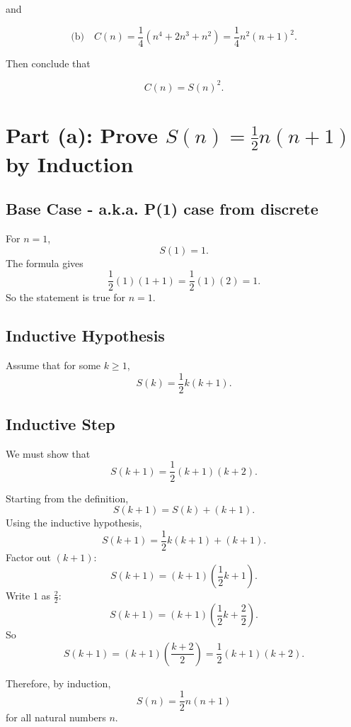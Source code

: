 \documentclass[12pt]{article}
\begin{document}
and

\[
\text{(b)}\quad C(n)=\frac{1}{4}(n^4+2n^3+n^2)=\frac{1}{4}n^2(n+1)^2.
\]

Then conclude that

\[
C(n)=S(n)^2.
\]

\vspace{6cm}

\newpage

\section*{Part (a): Prove \(S(n)=\frac{1}{2}n(n+1)\) by Induction}

\subsection*{Base Case - a.k.a. P(1) case from discrete}

For \(n=1\),
\[
S(1)=1.
\]
The formula gives
\[
\frac{1}{2}(1)(1+1)=\frac{1}{2}(1)(2)=1.
\]
So the statement is true for \(n=1\).

\vspace{3cm}

\subsection*{Inductive Hypothesis}

Assume that for some \(k\geq 1\),
\[
S(k)=\frac{1}{2}k(k+1).
\]

\vspace{3cm}

\subsection*{Inductive Step}

We must show that
\[
S(k+1)=\frac{1}{2}(k+1)(k+2).
\]

Starting from the definition,
\[
S(k+1)=S(k)+(k+1).
\]
Using the inductive hypothesis,
\[
S(k+1)=\frac{1}{2}k(k+1)+(k+1).
\]
Factor out \((k+1)\):
\[
S(k+1)=(k+1)\left(\frac{1}{2}k+1\right).
\]
Write \(1\) as \(\frac{2}{2}\):
\[
S(k+1)=(k+1)\left(\frac{1}{2}k+\frac{2}{2}\right).
\]
So
\[
S(k+1)=(k+1)\left(\frac{k+2}{2}\right)
=\frac{1}{2}(k+1)(k+2).
\]

Therefore, by induction,
\[
S(n)=\frac{1}{2}n(n+1)
\]
for all natural numbers \(n\).

\vspace{5cm}

\newpage
\end{document}
